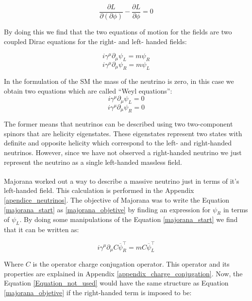 \begin{equation}
\frac{\partial L}{\partial (\partial \phi)} - \frac{\partial L}{\partial \phi} = 0
\end{equation}

By doing this we find that the two equations of motion for the fields are two coupled Dirac equations for the right- and left- handed fields:

\begin{equation}\label{majorana_objetive}
i \gamma ^\mu \partial_\mu \psi_L = m \psi_R
\end{equation} 
\begin{equation}\label{majorana_start}
i \gamma ^\mu \partial_\mu \psi_R = m \psi_L
\end{equation} 

In the formulation of the SM the mass of the neutrino is zero, in this case we obtain two equations which are called ``Weyl equations'':
\begin{equation}
i \gamma ^\mu \partial_\mu \psi_L = 0
\end{equation}
\begin{equation}
i \gamma ^\mu \partial_\mu \psi_R = 0
\end{equation}

The former means that neutrinos can be described using two two-component spinors that are helicity eigenstates. These eigenstates represent two states 
with definite and opposite helicity which correspond to the left- and right-handed neutrinos. However, since we have not observed a right-handed neutrino 
we just represent the neutrino as a single left-handed massless field.  \\
\\
Majorana worked out a way to describe a massive neutrino just in terms of it's left-handed field.
This calculation is performed in the Appendix \ref{apendice_neutrinos}. The objective of Majorana was to write the Equation
\ref{majorana_start} as \ref{majorana_objetive} by finding an expression for $\psi_R$ in terms of $\psi_L$. By doing some manipulations of the Equation \ref{majorana_start} we 
find that it can be written as:  

\begin{equation} \label{Equation_not_used}
i \gamma^\mu \partial_\mu C \overline{\psi}^\intercal_R = m C \overline{\psi}^{\intercal}_L
\end{equation}

Where $C$ is the operator charge conjugation operator. This operator and its properties are explained in Appendix \ref{appendix_charge_conjugation}. Now, the Equation \ref{Equation_not_used} would have the same structure
as Equation \ref{majorana_objetive} if the right-handed term is imposed to be:

